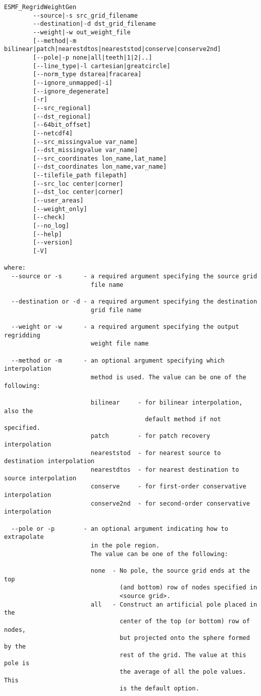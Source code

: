 \begin{verbatim}
ESMF_RegridWeightGen  
        --source|-s src_grid_filename
        --destination|-d dst_grid_filename
        --weight|-w out_weight_file
        [--method|-m bilinear|patch|nearestdtos|neareststod|conserve|conserve2nd]
        [--pole|-p none|all|teeth|1|2|..]
        [--line_type|-l cartesian|greatcircle]
        [--norm_type dstarea|fracarea]
        [--ignore_unmapped|-i]
        [--ignore_degenerate]
        [-r]
        [--src_regional]
        [--dst_regional]
        [--64bit_offset]
        [--netcdf4]
        [--src_missingvalue var_name]
        [--dst_missingvalue var_name]
        [--src_coordinates lon_name,lat_name]
        [--dst_coordinates lon_name,var_name]
        [--tilefile_path filepath]
        [--src_loc center|corner]
        [--dst_loc center|corner]
        [--user_areas]
        [--weight_only]
        [--check]
        [--no_log]
        [--help]
        [--version]
        [-V]

where:
  --source or -s      - a required argument specifying the source grid
                        file name

  --destination or -d - a required argument specifying the destination
                        grid file name

  --weight or -w      - a required argument specifying the output regridding
                        weight file name

  --method or -m      - an optional argument specifying which interpolation
                        method is used. The value can be one of the following:

                        bilinear     - for bilinear interpolation, also the
                                       default method if not specified.
                        patch        - for patch recovery interpolation
                        neareststod  - for nearest source to destination interpolation
                        nearestdtos  - for nearest destination to source interpolation
                        conserve     - for first-order conservative interpolation
                        conserve2nd  - for second-order conservative interpolation

  --pole or -p        - an optional argument indicating how to extrapolate 
                        in the pole region. 
                        The value can be one of the following:

                        none  - No pole, the source grid ends at the top
                                (and bottom) row of nodes specified in
                                <source grid>.
                        all   - Construct an artificial pole placed in the
                                center of the top (or bottom) row of nodes,
                                but projected onto the sphere formed by the
                                rest of the grid. The value at this pole is
                                the average of all the pole values. This
                                is the default option.


\end{verbatim}
